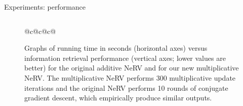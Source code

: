 \documentclass[first=dgreen,second=purple,logo=yellowexc]{aaltoslides}
\begin{document}
\begin{frame}{Experiments: performance}
\begin{figure}[!htb]
\begin{columns}
\begin{column}{0.65\textwidth}
\begin{tabular}{{@{}c@{}c@{}c@{}}}
\end{tabular}
\end{column}
\begin{column}{0.25\textwidth}
\caption{\tiny{Graphs of running time in seconds (horizontal axes) versus information
  retrieval performance (vertical axes; lower values are better) for
  the original additive NeRV and for our new multiplicative
  NeRV. The multiplicative NeRV performs 300 multiplicative 
  update iterations and the original NeRV performs 10 rounds of conjugate gradient descent, which empirically 
  produce similar outputs.}}
\end{column}
\end{columns}
\label{fig:benchmark}
\end{figure}
\end{frame}
\end{document}
